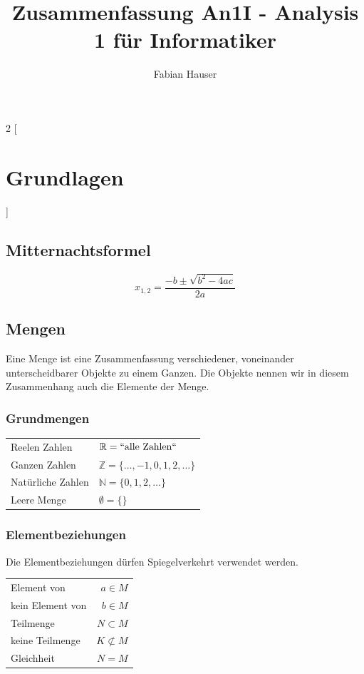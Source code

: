 

\title{Zusammenfassung An1I - Analysis 1 für Informatiker}
\author{Fabian Hauser}
 

\maketitle
\begin{multicols}{2}
[
\section{Grundlagen}
]

\subsection{Mitternachtsformel}
	\[
		x_{1,2} = \frac{-b \pm\sqrt{b^2-4ac}}{2a}
	\]

\subsection{Mengen}
	Eine Menge ist eine Zusammenfassung verschiedener, voneinander unterscheidbarer Objekte zu einem Ganzen. Die Objekte nennen wir in diesem Zusammenhang auch die
	Elemente der Menge.

\subsubsection{Grundmengen}
	\begin{tabular}{l l}
		Reelen Zahlen & $\mathbb{R}=``\text{alle Zahlen}``$ \\
		Ganzen Zahlen & $\mathbb{Z}=\{\dots ,-1,0,1,2,\dots\}$ \\
		Natürliche Zahlen & $\mathbb{N}=\{0,1,2,\dots\}$ \\
		Leere Menge & $\emptyset = \{\}$
	\end{tabular}


\subsubsection{Elementbeziehungen}
	Die Elementbeziehungen dürfen Spiegelverkehrt verwendet werden.
	
	\begin{tabular}{l r}
		Element von & $a \in M$ \\
		kein Element von & $b \in M$ \\
		Teilmenge & $N \subset M$ \\
		keine Teilmenge & $K \not\subset M$ \\
		Gleichheit & $N = M$
	\end{tabular}


\end{multicols}
